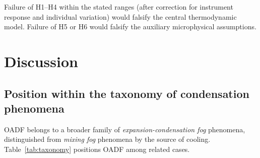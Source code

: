 \documentclass[11pt,a4paper]{article}
\theoremstyle{definition}
\theoremstyle{plain}
\begin{document}
Failure of H1–H4 within the stated ranges (after correction for instrument response and individual variation) would falsify the central thermodynamic model. Failure of H5 or H6 would falsify the auxiliary microphysical assumptions.

\section{Discussion}
\label{sec:discussion}

\subsection{Position within the taxonomy of condensation phenomena}
\label{sec:taxonomy}

OADF belongs to a broader family of \emph{expansion-condensation fog} phenomena, distinguished from \emph{mixing fog} phenomena by the source of cooling. Table~\ref{tab:taxonomy} positions OADF among related cases.
\end{document}
